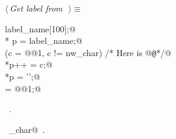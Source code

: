 \documentclass{report}
\begin{document}
\begin{flushleft} \small
\begin{minipage}{\linewidth} \label{scrap238}
$\langle\,${\it Get label from}\nobreak\ {\footnotesize {}}$\,\rangle\equiv$
\vspace{-1ex}
\begin{list}{}{} \item
\mbox{}\verb@char  label_name[100];@\\
\mbox{}\verb@char * p = label_name;@\\
\mbox{}\verb@while (c = @@1\verb@, c != nw_char) /* Here is @{\tt @}\verb@x */@\\
\mbox{}\verb@   *p++ = c;@\\
\mbox{}\verb@*p = '\0';@\\
\mbox{}\verb@c = @@1\verb@;@\\
\mbox{}\verb@@{\NWsep}
\end{list}
\vspace{-1ex}
\footnotesize\addtolength{\baselineskip}{-1ex}
\begin{list}{}{\setlength{\itemsep}{-\parsep}\setlength{\itemindent}{-\leftmargin}}
\item \NWtxtMacroRefIn\ .
\end{list}
\vspace{-2ex}
\footnotesize\addtolength{\baselineskip}{-1ex}
\begin{list}{}{\setlength{\itemsep}{-\parsep}\setlength{\itemindent}{-\leftmargin}}
\item \NWtxtIdentsUsed\nobreak\  \verb@nw_char@\nobreak\ .\end{list}
\end{minipage}\\[4ex]
\end{flushleft}
\end{document}
